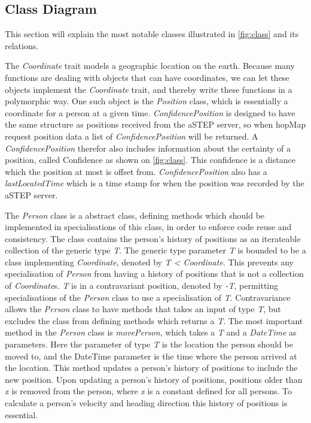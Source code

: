 \subsection{Class Diagram}
This section will explain the most notable classes illustrated in \cref{fig:class} and its relations.

The \emph{Coordinate} trait models a geographic location on the earth. Because many functions are dealing with objects that can have coordinates, we can let these objects implement the \emph{Coordinate} trait, and thereby write these functions in a polymorphic way. One such object is the \emph{Position} class, which is essentially a coordinate for a person at a given time. \emph{ConfidencePosition} is designed to have the same structure as positions received from the aSTEP server, so when hopMap request position data a list of \emph{ConfidencePosition} will be returned. A \emph{ConfidencePosition} therefor also includes information about the certainty of a position, called Confidence as shown on \cref{fig:class}. This confidence is a distance which the position at most is offset from. \emph{ConfidencePosition} also has a \emph{lastLocatedTime} which is a time stamp for when the position was recorded by the aSTEP server.


The \emph{Person} class is a abstract class, defining methods which should be implemented in specialisations of this class, in order to enforce code reuse and consistency. The class contains the person's history of positions as an iterateable collection of the generic type \emph{T}. The generic type parameter \emph{T} is bounded to be a class implementing \emph{Coordinate}, denoted by \emph{T < Coordinate}. This prevents any specialisation of \emph{Person} from having a history of positions that is not a collection of \emph{Coordinate}s. \emph{T} is in a contravariant position, denoted by \emph{-T}, permitting specialisations of the \emph{Person} class to use a specialisation of \emph{T}. Contravariance allows the \emph{Person} class to have methods that takes an input of type \emph{T}, but excludes the class from defining methods which returns a \emph{T}. The most important method in the \emph{Person} class is \emph{movePerson}, which takes a \emph{T} and a \emph{DateTime} as parameters. Here the parameter of type \emph{T} is the location the person should be moved to, and the DateTime parameter is the time where the person arrived at the location. This method updates a person's history of positions to include the new position. Upon updating a person's history of positions, positions older than \emph{x} is removed from the person, where \emph{x} is a constant defined for all persons. To calculate a person's velocity and heading direction this history of positions is essential. 

